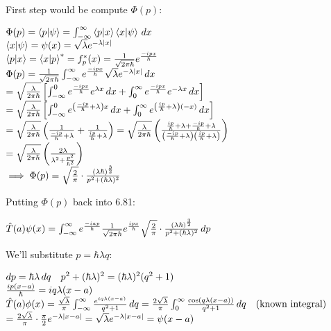 \documentclass[14pt]{extarticle}
\makeatletter
\newenvironment{lefteqs}{%
    \begin{flushleft}%
    \renewcommand{\arraystretch}{1.3}%
    $\begin{array}{@{}l@{}}%
}{%
    \end{array}$%
    \end{flushleft}%
}
\makeatother
\begin{document}
First step would be compute $\Phi(p)$:
\begin{lefteqs}
    \Phi(p) = \braket{p | \psi} = \int_{-\infty}^{\infty} \braket{p | x} \braket{x | \psi} \, dx \\
    \braket{x | \psi} = \psi(x) = \sqrt{\lambda} e^{-\lambda |x|} \\
    \braket{p | x} = \braket{x | p}^* = f_p^*(x) = \frac{1}{\sqrt{2\pi\hbar}} e^{\frac{-i p x}{\hbar}} \\
    \Phi(p) = \frac{1}{\sqrt{2\pi\hbar}} \int_{-\infty}^{\infty} e^{\frac{-i p x}{\hbar}} \sqrt{\lambda} e^{-\lambda |x|} \, dx \\
    = \sqrt{\frac{\lambda}{2\pi\hbar}} \left[ \int_{-\infty}^{0}e^{\frac{-ipx}{\hbar}}e^{\lambda x} \, dx + \int_{0}^{\infty} e^{\frac{-ipx}{\hbar}} e^{-\lambda x} \, dx \right] \\
    = \sqrt{\frac{\lambda}{2\pi\hbar}} \left[ \int_{-\infty}^{0} e^{\left(\frac{-ip}{\hbar} + \lambda \right)x} \, dx + \int_{0}^{\infty} e^{\left(\frac{ip}{\hbar} + \lambda \right)(-x)} \, dx \right] \\
    = \sqrt{\frac{\lambda}{2\pi\hbar}} \left( \frac{1}{\frac{-ip}{\hbar} + \lambda} + \frac{1}{\frac{ip}{\hbar} + \lambda} \right)
    = \sqrt{\frac{\lambda}{2\pi\hbar}} \left( \frac{\frac{ip}{\hbar} + \lambda + \frac{-ip}{\hbar} + \lambda}{\left(\frac{-ip}{\hbar} + \lambda\right)\left(\frac{ip}{\hbar} + \lambda\right)} \right) \\
    = \sqrt{\frac{\lambda}{2\pi\hbar}} \left( \frac{2\lambda}{\lambda^2 + \frac{p^2}{\hbar^2}} \right) \\
    \implies \Phi(p) = \sqrt{\frac{2}{\pi}} \cdot \frac{(\lambda \hbar)^{\frac{3}{2}}}{p^2 + (\hbar \lambda)^2}
\end{lefteqs}

Putting $\Phi(p)$ back into 6.81:

\begin{lefteqs}
    \hat{T}(a) \psi(x) = \int_{-\infty}^{\infty} e^{\frac{-iap}{\hbar}} \frac{1}{\sqrt{2\pi \hbar}} e^{\frac{ipx}{\hbar}} \sqrt{\frac{2}{\pi}} \cdot \frac{(\lambda \hbar)^{\frac{3}{2}}}{p^2 + (\hbar \lambda)^2} \, dp \\
\end{lefteqs}

We'll substitute $p=\hbar \lambda q$:
\begin{lefteqs}
    dp = \hbar \lambda \, dq \quad p^2 + (\hbar \lambda)^2 = (\hbar \lambda)^2 (q^2 + 1) \\
    \frac{ip(x-a)}{\hbar} = iq\lambda(x-a) \\
    \hat{T}(a) \phi(x) = \frac{\sqrt{\lambda}}{\pi} \int_{-\infty}^{\infty} \frac{e^{iq\lambda(x-a)}}{q^2 + 1} \, dq
    = \frac{2\sqrt{\lambda}}{\pi} \int_{0}^{\infty} \frac{\cos(q\lambda(x-a))}{q^2 + 1} \, dq \quad \text{(known integral)} \\
    = \frac{2\sqrt{\lambda}}{\pi} \cdot \frac{\pi}{2} e^{-\lambda |x-a|}
    = \sqrt{\lambda} e^{-\lambda |x-a|} = \psi(x-a)
\end{lefteqs}
\end{document}
